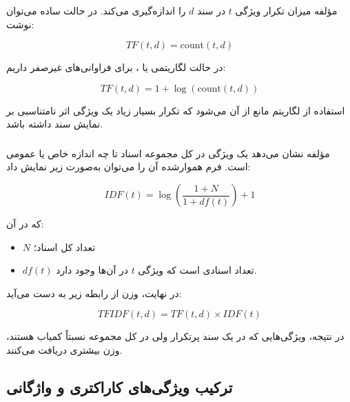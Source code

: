مؤلفه
میزان تکرار ویژگی $t$ در سند $d$ را اندازه‌گیری می‌کند. در حالت ساده می‌توان نوشت:

\begin{equation}
TF(t,d)=\mathrm{count}(t,d)
\end{equation}

در حالت لگاریتمی یا
،
برای فراوانی‌های غیرصفر داریم:

\begin{equation}
TF(t,d)=1+\log(\mathrm{count}(t,d))
\end{equation}

استفاده از لگاریتم مانع از آن می‌شود که تکرار بسیار زیاد یک ویژگی اثر نامتناسبی بر نمایش سند داشته باشد.


\subsubsection{}

مؤلفه
نشان می‌دهد یک ویژگی در کل مجموعه اسناد تا چه اندازه خاص یا عمومی است. فرم هموارشده آن را می‌توان به‌صورت زیر نمایش داد:

\begin{equation}
IDF(t)
=
\log
\left(
\frac{1+N}{1+df(t)}
\right)
+1
\end{equation}

که در آن:

\begin{itemize}

	\item $N$ تعداد کل اسناد؛

	\item $df(t)$ تعداد اسنادی است که ویژگی $t$ در آن‌ها وجود دارد.

\end{itemize}

در نهایت، وزن
از رابطه زیر به دست می‌آید:

\begin{equation}
TFIDF(t,d)
=
TF(t,d)\times IDF(t)
\end{equation}

در نتیجه، ویژگی‌هایی که در یک سند پرتکرار ولی در کل مجموعه نسبتاً کمیاب هستند، وزن بیشتری دریافت می‌کنند.


\subsection{ترکیب ویژگی‌های کاراکتری و واژگانی}


